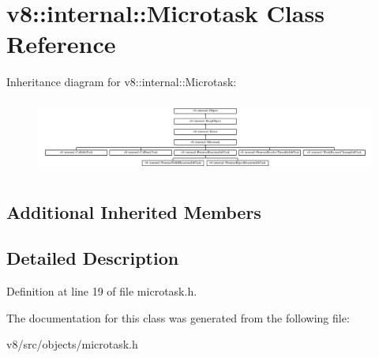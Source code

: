 \hypertarget{classv8_1_1internal_1_1Microtask}{}\section{v8\+:\+:internal\+:\+:Microtask Class Reference}
\label{classv8_1_1internal_1_1Microtask}
Inheritance diagram for v8\+:\+:internal\+:\+:Microtask\+:\begin{figure}[H]
\begin{center}
\leavevmode
\includegraphics[height=2.425993cm]{classv8_1_1internal_1_1Microtask}
\end{center}
\end{figure}
\subsection*{Additional Inherited Members}


\subsection{Detailed Description}


Definition at line 19 of file microtask.\+h.



The documentation for this class was generated from the following file\+:\begin{DoxyCompactItemize}
\item 
v8/src/objects/microtask.\+h\end{DoxyCompactItemize}
